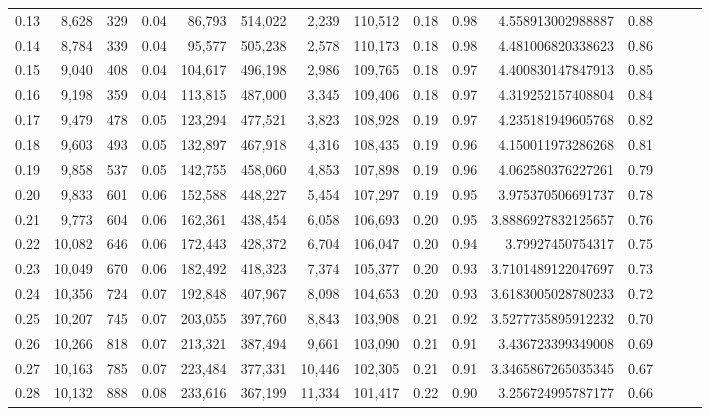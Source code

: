 \begin{tabular}{rrrrrrrrrrrrrrr}
0.13 &   8,628 &    329 &  0.04 &   86,793 &  514,022 &    2,239 &  110,512 &  0.18 &  0.98 &      4.558913002988887 &      0.88 \\
0.14 &   8,784 &    339 &  0.04 &   95,577 &  505,238 &    2,578 &  110,173 &  0.18 &  0.98 &      4.481006820338623 &      0.86 \\
0.15 &   9,040 &    408 &  0.04 &  104,617 &  496,198 &    2,986 &  109,765 &  0.18 &  0.97 &      4.400830147847913 &      0.85 \\
0.16 &   9,198 &    359 &  0.04 &  113,815 &  487,000 &    3,345 &  109,406 &  0.18 &  0.97 &      4.319252157408804 &      0.84 \\
0.17 &   9,479 &    478 &  0.05 &  123,294 &  477,521 &    3,823 &  108,928 &  0.19 &  0.97 &      4.235181949605768 &      0.82 \\
0.18 &   9,603 &    493 &  0.05 &  132,897 &  467,918 &    4,316 &  108,435 &  0.19 &  0.96 &      4.150011973286268 &      0.81 \\
0.19 &   9,858 &    537 &  0.05 &  142,755 &  458,060 &    4,853 &  107,898 &  0.19 &  0.96 &      4.062580376227261 &      0.79 \\
0.20 &   9,833 &    601 &  0.06 &  152,588 &  448,227 &    5,454 &  107,297 &  0.19 &  0.95 &      3.975370506691737 &      0.78 \\
0.21 &   9,773 &    604 &  0.06 &  162,361 &  438,454 &    6,058 &  106,693 &  0.20 &  0.95 &     3.8886927832125657 &      0.76 \\
0.22 &  10,082 &    646 &  0.06 &  172,443 &  428,372 &    6,704 &  106,047 &  0.20 &  0.94 &       3.79927450754317 &      0.75 \\
0.23 &  10,049 &    670 &  0.06 &  182,492 &  418,323 &    7,374 &  105,377 &  0.20 &  0.93 &     3.7101489122047697 &      0.73 \\
0.24 &  10,356 &    724 &  0.07 &  192,848 &  407,967 &    8,098 &  104,653 &  0.20 &  0.93 &     3.6183005028780233 &      0.72 \\
0.25 &  10,207 &    745 &  0.07 &  203,055 &  397,760 &    8,843 &  103,908 &  0.21 &  0.92 &     3.5277735895912232 &      0.70 \\
0.26 &  10,266 &    818 &  0.07 &  213,321 &  387,494 &    9,661 &  103,090 &  0.21 &  0.91 &      3.436723399349008 &      0.69 \\
0.27 &  10,163 &    785 &  0.07 &  223,484 &  377,331 &   10,446 &  102,305 &  0.21 &  0.91 &     3.3465867265035345 &      0.67 \\
0.28 &  10,132 &    888 &  0.08 &  233,616 &  367,199 &   11,334 &  101,417 &  0.22 &  0.90 &      3.256724995787177 &      0.66 \\

\end{tabular}
